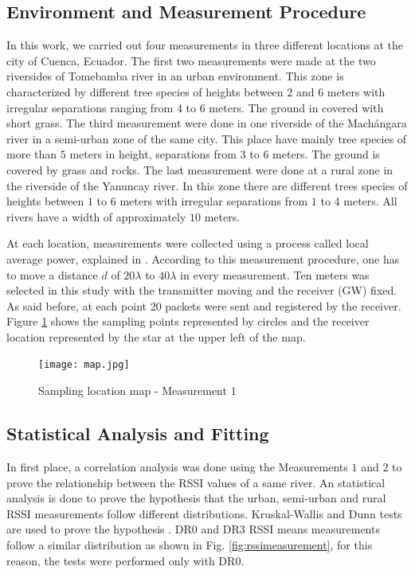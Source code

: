 \subsection{Environment and Measurement Procedure}

In this work, we carried out four measurements in three different locations at the city of Cuenca, Ecuador. The first two measurements were made at the two riversides of Tomebamba river in an urban environment. This zone is characterized by different tree species of heights between $2$ and $6$ meters with irregular separations ranging from $4$ to $6$ meters. The ground in covered with short grass. 
The third measurement were done in one riverside of the Machángara river in a semi-urban zone of the same city. This place have mainly tree species of more than $5$ meters in height, separations from $3$ to $6$ meters. The ground is covered by grass and rocks. The last measurement were done at a rural zone in the riverside of the Yanuncay river. In this zone there are different trees species of heights between $1$ to $6$ meters with irregular separations from $1$ to $4$ meters. All rivers have a width of approximately $10$ meters.

 At each location, measurements were collected using a process called local average power, explained in \cite{Lee1985}. According to this measurement procedure, one has to move a distance $d$ of $20\lambda$ to $40\lambda$ in every measurement. Ten meters was selected in this study with the transmitter moving and the receiver (GW) fixed. As said before, at each point 20 packets were sent and registered by the receiver. Figure \ref{fig:locationmap} shows the sampling points represented by circles and the receiver location represented by the star at the upper left of the map.

\begin{figure}[h!]
  \centering
  \texttt{[image: map.jpg]}
  \caption{Sampling location map - Measurement $1$}
  \label{fig:locationmap}
\end{figure}

\subsection{Statistical Analysis and Fitting}
\label{sub:statistical}
In first place, a correlation analysis was done using the Measurements $1$ and $2$ to prove the relationship between the RSSI values of a same river.
An statistical analysis is done to prove the hypothesis that the urban, semi-urban and rural RSSI measurements follow different distributions. Kruskal-Wallis and Dunn tests are used to prove the hypothesis \cite{Mendenhall2010}. DR$0$ and DR$3$ RSSI means measurements follow a similar distribution as shown in Fig. \ref{fig:rssimeasurement}, for this reason, the tests were performed only with DR$0$.

